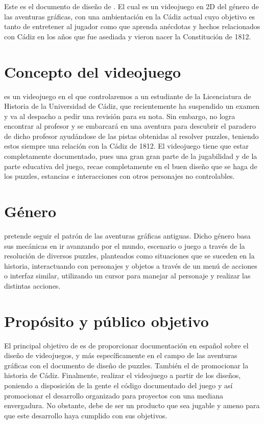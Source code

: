Este es el documento de diseño de \nombrejuego. El cual es un videojuego en 2D del género de las aventuras gráficas, con una ambientación en la Cádiz actual cuyo objetivo es tanto de entretener al jugador como que aprenda anécdotas y hechos relacionados con Cádiz en los años que fue asediada y vieron nacer la Constitución de 1812.

    \section{Concepto del videojuego}
        \nombrejuego es un videojuego en el que controlaremos a un estudiante de la Licenciatura de Historia de la Universidad de Cádiz, que recientemente ha suspendido un examen y va al despacho a pedir una revisión para su nota. Sin embargo, no logra encontrar al profesor y se embarcará en una aventura para descubrir el paradero de dicho profesor ayudándose de las pistas obtenidas al resolver puzzles, teniendo estos siempre una relación con la Cádiz de 1812. El videojuego tiene que estar completamente documentado, pues una gran gran parte de la jugabilidad y de la parte educativa del juego, recae completamente en el buen diseño que se haga de los puzzles, estancias e interacciones con otros personajes no controlables.
        
    \section{Género}
        \nombrejuego pretende seguir el patrón de las aventuras gráficas antiguas. Dicho género basa sus mecánicas en ir avanzando por el mundo, escenario o juego a través de la resolución de diversos puzzles, planteados como situaciones que se suceden en la historia, interactuando con personajes y objetos a través de un menú de acciones o interfaz similar, utilizando un cursor para manejar al personaje y realizar las distintas acciones.
        
    \section{Propósito y público objetivo}
        El principal objetivo de \nombrejuego es de proporcionar documentación en español sobre el diseño de videojuegos, y más específicamente en el campo de las aventuras gráficas con el documento de diseño de puzzles. También el de promocionar la historia de Cádiz. Finalmente, realizar el videojuego a partir de los diseños, poniendo a disposición de la gente el código documentado del juego y así promocionar el desarrollo organizado para proyectos con una mediana envergadura. No obstante, debe de ser un producto que sea jugable y ameno para que este desarrollo haya cumplido con sus objetivos.
        
